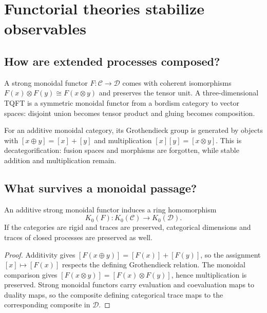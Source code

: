 \chapter{Functorial theories stabilize observables}
\label{ch:generalized}



\section{How are extended processes composed?}

A strong monoidal functor $F:\mathcal C\to\mathcal D$ comes with coherent
isomorphisms $F(x)\otimes F(y)\cong F(x\otimes y)$ and preserves the tensor
unit.  A three-dimensional TQFT is a symmetric monoidal functor from a bordism
category to vector spaces: disjoint union becomes tensor product and gluing
becomes composition.

For an additive monoidal category, its Grothendieck group is generated by
objects with $[x\oplus y]=[x]+[y]$ and multiplication
$[x][y]=[x\otimes y]$.  This is decategorification: fusion spaces and
morphisms are forgotten, while stable addition and multiplication remain.

\section{What survives a monoidal passage?}

\begin{theorem}
An additive strong monoidal functor induces a ring homomorphism
\[
K_0(F):K_0(\mathcal C)\longrightarrow K_0(\mathcal D).
\]
If the categories are rigid and traces are preserved, categorical dimensions
and traces of closed processes are preserved as well.
\end{theorem}

\begin{proof}
Additivity gives
$[F(x\oplus y)]=[F(x)]+[F(y)]$, so the assignment $[x]\mapsto[F(x)]$
respects the defining Grothendieck relation.  The monoidal comparison gives
$[F(x\otimes y)]=[F(x)\otimes F(y)]$, hence multiplication is preserved.
Strong monoidal functors carry evaluation and coevaluation maps to duality
maps, so the composite defining categorical trace maps to the corresponding
composite in $\mathcal D$.
\end{proof}

